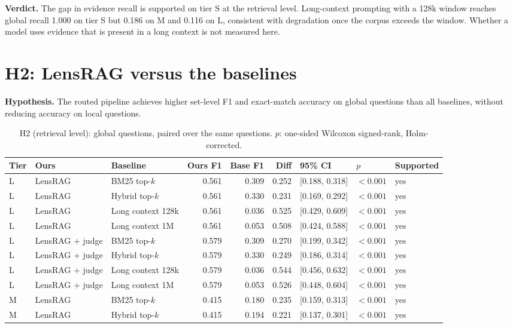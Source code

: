 \documentclass[11pt]{article}
\begin{document}
\textbf{Verdict.} The gap in evidence recall is supported on tier S at the retrieval level. Long-context prompting with a 128k window reaches global recall 1.000 on tier S but 0.186 on M and 0.116 on L, consistent with degradation once the corpus exceeds the window. Whether a model uses evidence that is present in a long context is not measured here.

\section{H2: LensRAG versus the baselines}

\textbf{Hypothesis.} The routed pipeline achieves higher set-level F1 and exact-match accuracy on global questions than all baselines, without reducing accuracy on local questions.

\begin{table}[htbp]
\centering\small
\caption{H2 (retrieval level): global questions, paired over the same questions. $p$: one-sided Wilcoxon signed-rank, Holm-corrected.}
\label{tab:h2}
\begin{tabular}{lllrrrlll}
\toprule
Tier & Ours & Baseline & Ours F1 & Base F1 & Diff & 95\% CI & $p$ & Supported \\
\midrule
L & LensRAG & BM25 top-$k$ & 0.561 & 0.309 & 0.252 & [0.188, 0.318] & $<0.001$ & yes \\
L & LensRAG & Hybrid top-$k$ & 0.561 & 0.330 & 0.231 & [0.169, 0.292] & $<0.001$ & yes \\
L & LensRAG & Long context 128k & 0.561 & 0.036 & 0.525 & [0.429, 0.609] & $<0.001$ & yes \\
L & LensRAG & Long context 1M & 0.561 & 0.053 & 0.508 & [0.424, 0.588] & $<0.001$ & yes \\
L & LensRAG + judge & BM25 top-$k$ & 0.579 & 0.309 & 0.270 & [0.199, 0.342] & $<0.001$ & yes \\
L & LensRAG + judge & Hybrid top-$k$ & 0.579 & 0.330 & 0.249 & [0.186, 0.314] & $<0.001$ & yes \\
L & LensRAG + judge & Long context 128k & 0.579 & 0.036 & 0.544 & [0.456, 0.632] & $<0.001$ & yes \\
L & LensRAG + judge & Long context 1M & 0.579 & 0.053 & 0.526 & [0.448, 0.604] & $<0.001$ & yes \\
M & LensRAG & BM25 top-$k$ & 0.415 & 0.180 & 0.235 & [0.159, 0.313] & $<0.001$ & yes \\
M & LensRAG & Hybrid top-$k$ & 0.415 & 0.194 & 0.221 & [0.137, 0.301] & $<0.001$ & yes \\

\end{tabular}
\end{table}
\end{document}
